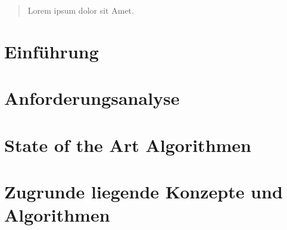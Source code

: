 \documentclass[pdftex,12pt,a4paper]{report}
\begin{document}

\deckblatt



\erklaerung



\begin{abstract}

Lorem ipsum dolor sit Amet.

\end{abstract}



\tableofcontents



\chapter{Einführung}
\label{chp:introduction}



\chapter{Anforderungsanalyse}
\label{chp:anforderungsanalyse}



\chapter{State of the Art Algorithmen}
\label{chp:stateoftheart}



\chapter{Zugrunde liegende Konzepte und Algorithmen}
\label{chp:concepts}

\end{document}

